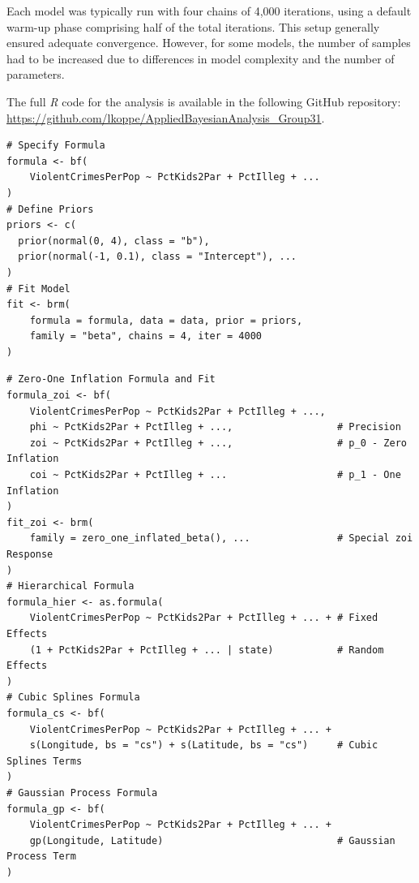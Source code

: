 \documentclass[12pt]{article}
\begin{document}
Each model was typically run with four chains of 4,000 iterations, using a default warm-up phase comprising half of the total iterations. This setup generally ensured adequate convergence. However, for some models, the number of samples had to be increased due to differences in model complexity and the number of parameters.

The full \textit{R} code for the analysis is available in the following GitHub repository:  
\url{https://github.com/lkoppe/AppliedBayesianAnalysis_Group31}.

\begin{listing}[H]
\caption{General Bayesian Model Setup in \textit{R} with \textit{brms}}
\label{lst:brms_example}
\begin{verbatim}
# Specify Formula
formula <- bf(
    ViolentCrimesPerPop ~ PctKids2Par + PctIlleg + ...
)
# Define Priors
priors <- c(
  prior(normal(0, 4), class = "b"),
  prior(normal(-1, 0.1), class = "Intercept"), ...
)
# Fit Model
fit <- brm(
    formula = formula, data = data, prior = priors, 
    family = "beta", chains = 4, iter = 4000
)
\end{verbatim}
\end{listing}

\begin{listing}[H]
\caption{Required Adjustments for Models in \textit{R} with \textit{brms}}
\label{lst:extended_code}
\begin{verbatim}
# Zero-One Inflation Formula and Fit
formula_zoi <- bf(
    ViolentCrimesPerPop ~ PctKids2Par + PctIlleg + ...,    
    phi ~ PctKids2Par + PctIlleg + ...,                  # Precision
    zoi ~ PctKids2Par + PctIlleg + ...,                  # p_0 - Zero Inflation
    coi ~ PctKids2Par + PctIlleg + ...                   # p_1 - One Inflation
)
fit_zoi <- brm(
    family = zero_one_inflated_beta(), ...               # Special zoi Response
)
# Hierarchical Formula
formula_hier <- as.formula(
    ViolentCrimesPerPop ~ PctKids2Par + PctIlleg + ... + # Fixed Effects
    (1 + PctKids2Par + PctIlleg + ... | state)           # Random Effects
)
# Cubic Splines Formula
formula_cs <- bf(
    ViolentCrimesPerPop ~ PctKids2Par + PctIlleg + ... +
    s(Longitude, bs = "cs") + s(Latitude, bs = "cs")     # Cubic Splines Terms
)
# Gaussian Process Formula
formula_gp <- bf(
    ViolentCrimesPerPop ~ PctKids2Par + PctIlleg + ... +   
    gp(Longitude, Latitude)                              # Gaussian Process Term
)
\end{verbatim}
\end{listing}
\end{document}
